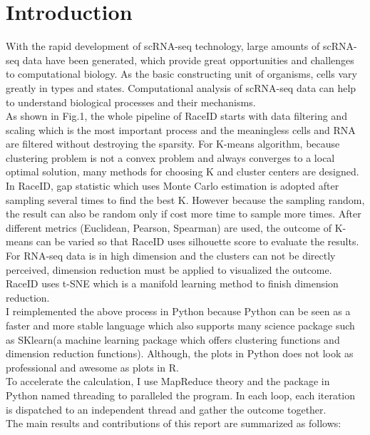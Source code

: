 \documentclass[10pt,journal]{IEEEtran}
\begin{document}
\section{Introduction}
  With the rapid development of scRNA-seq technology, large amounts of scRNA-seq data have been generated, which provide great opportunities and challenges to computational biology. As the basic constructing unit of organisms, cells vary greatly in types and states. Computational analysis of scRNA-seq data can help to understand biological processes and their mechanisms. \\
\hspace*{0.2 cm} As shown in Fig.1, the whole pipeline of RaceID starts with data filtering and scaling which is the most important process and the meaningless cells and RNA are filtered without destroying the sparsity. For K-means algorithm, because clustering problem is not a convex problem and always converges to a local optimal solution, many methods for choosing  K and cluster centers are designed. In RaceID, gap statistic which uses Monte Carlo estimation is adopted after sampling several times to find the best K. However because the sampling random, the result can also be random only if cost more time to sample more times. After different metrics (Euclidean, Pearson, Spearman) are used, the outcome of K-means can be varied so that RaceID uses silhouette score to evaluate the results. For RNA-seq data is in high dimension and the clusters can not be directly perceived, dimension reduction must be applied to visualized the outcome. RaceID uses t-SNE which is a manifold learning method to finish dimension reduction.\\
\hspace*{0.2 cm} I reimplemented the above process in Python because Python can be seen as a faster and more stable language which also supports many science package such as SKlearn(a machine learning package which offers clustering functions and dimension reduction  functions). Although, the plots in Python does not look as professional and awesome as plots in R.\\
\hspace*{0.2 cm} To accelerate the calculation, I use MapReduce theory and the package in Python named threading to paralleled the program. In each loop, each iteration is dispatched to an independent thread and gather the outcome together. \\
\hspace*{0.2 cm} The main results and contributions of this report are summarized as follows:
\end{document}
